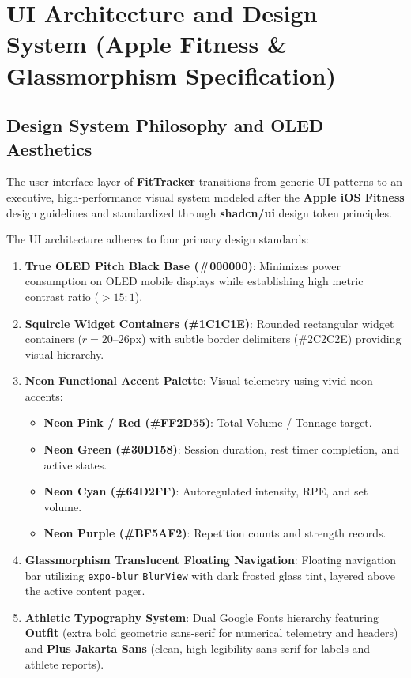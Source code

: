 \section{UI Architecture and Design System (Apple Fitness \& Glassmorphism Specification)}

\subsection{Design System Philosophy and OLED Aesthetics}
The user interface layer of \textbf{FitTracker} transitions from generic UI patterns to an executive, high-performance visual system modeled after the \textbf{Apple iOS Fitness} design guidelines and standardized through \textbf{shadcn/ui} design token principles.

The UI architecture adheres to four primary design standards:
\begin{enumerate}
    \item \textbf{True OLED Pitch Black Base (\#000000)}: Minimizes power consumption on OLED mobile displays while establishing high metric contrast ratio ($> 15:1$).
    \item \textbf{Squircle Widget Containers (\#1C1C1E)}: Rounded rectangular widget containers ($r = 20\text{--}26\text{px}$) with subtle border delimiters (\#2C2C2E) providing visual hierarchy.
    \item \textbf{Neon Functional Accent Palette}: Visual telemetry using vivid neon accents:
    \begin{itemize}
        \item \textbf{Neon Pink / Red (\#FF2D55)}: Total Volume / Tonnage target.
        \item \textbf{Neon Green (\#30D158)}: Session duration, rest timer completion, and active states.
        \item \textbf{Neon Cyan (\#64D2FF)}: Autoregulated intensity, RPE, and set volume.
        \item \textbf{Neon Purple (\#BF5AF2)}: Repetition counts and strength records.
    \end{itemize}
    \item \textbf{Glassmorphism Translucent Floating Navigation}: Floating navigation bar utilizing \texttt{expo-blur} \texttt{BlurView} with dark frosted glass tint, layered above the active content pager.
    \item \textbf{Athletic Typography System}: Dual Google Fonts hierarchy featuring \textbf{Outfit} (extra bold geometric sans-serif for numerical telemetry and headers) and \textbf{Plus Jakarta Sans} (clean, high-legibility sans-serif for labels and athlete reports).
\end{enumerate}

